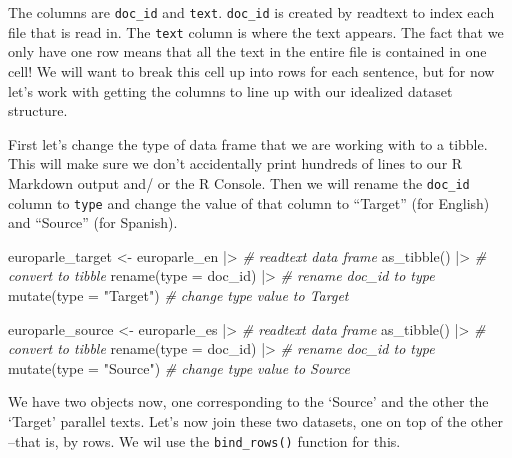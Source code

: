 \documentclass[
  letterpaper,
]{latex/krantz}
\newenvironment{Shaded}{\begin{snugshade}}{\end{snugshade}}
\newcommand{\AttributeTok}[1]{\textcolor[rgb]{0.00,0.00,0.00}{#1}}
\newcommand{\CommentTok}[1]{\textcolor[rgb]{0.00,0.00,0.00}{\textit{#1}}}
\newcommand{\FunctionTok}[1]{\textcolor[rgb]{0.00,0.00,0.00}{#1}}
\newcommand{\NormalTok}[1]{\textcolor[rgb]{0.00,0.00,0.00}{#1}}
\newcommand{\OtherTok}[1]{\textcolor[rgb]{0.00,0.00,0.00}{#1}}
\newcommand{\SpecialCharTok}[1]{\textcolor[rgb]{0.00,0.00,0.00}{#1}}
\newcommand{\StringTok}[1]{\textcolor[rgb]{0.00,0.00,0.00}{#1}}
\begin{document}
The columns are \texttt{doc\_id} and \texttt{text}. \texttt{doc\_id} is
created by readtext to index each file that is read in. The
\texttt{text} column is where the text appears. The fact that we only
have one row means that all the text in the entire file is contained in
one cell! We will want to break this cell up into rows for each
sentence, but for now let's work with getting the columns to line up
with our idealized dataset structure.

First let's change the type of data frame that we are working with to a
tibble. This will make sure we don't accidentally print hundreds of
lines to our R Markdown output and/ or the R Console. Then we will
rename the \texttt{doc\_id} column to \texttt{type} and change the value
of that column to ``Target'' (for English) and ``Source'' (for Spanish).

\begin{Shaded}
\begin{Highlighting}[]
\NormalTok{europarle\_target }\OtherTok{\textless{}{-}} 
\NormalTok{  europarle\_en }\SpecialCharTok{|\textgreater{}} \CommentTok{\# readtext data frame}
  \FunctionTok{as\_tibble}\NormalTok{() }\SpecialCharTok{|\textgreater{}} \CommentTok{\# convert to tibble}
  \FunctionTok{rename}\NormalTok{(}\AttributeTok{type =}\NormalTok{ doc\_id) }\SpecialCharTok{|\textgreater{}} \CommentTok{\# rename doc\_id to type}
  \FunctionTok{mutate}\NormalTok{(}\AttributeTok{type =} \StringTok{"Target"}\NormalTok{) }\CommentTok{\# change type value to \textquotesingle{}Target\textquotesingle{}}

\NormalTok{europarle\_source }\OtherTok{\textless{}{-}} 
\NormalTok{  europarle\_es }\SpecialCharTok{|\textgreater{}} \CommentTok{\# readtext data frame}
  \FunctionTok{as\_tibble}\NormalTok{() }\SpecialCharTok{|\textgreater{}} \CommentTok{\# convert to tibble}
  \FunctionTok{rename}\NormalTok{(}\AttributeTok{type =}\NormalTok{ doc\_id) }\SpecialCharTok{|\textgreater{}} \CommentTok{\# rename doc\_id to type}
  \FunctionTok{mutate}\NormalTok{(}\AttributeTok{type =} \StringTok{"Source"}\NormalTok{) }\CommentTok{\# change type value to \textquotesingle{}Source\textquotesingle{}}
\end{Highlighting}
\end{Shaded}

We have two objects now, one corresponding to the `Source' and the other
the `Target' parallel texts. Let's now join these two datasets, one on
top of the other --that is, by rows. We wil use the
\texttt{bind\_rows()} function for this.
\end{document}
